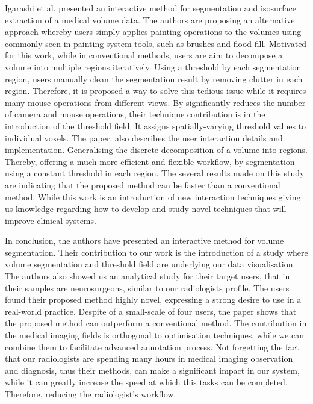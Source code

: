 Igarashi et al. \cite{igarashi2016interactive} presented an interactive method for segmentation and isosurface extraction of a medical volume data. The authors are proposing an alternative approach whereby users simply applies painting operations to the volumes using commonly seen in painting system tools, such as brushes and flood fill. Motivated for this work, while in conventional methods, users are aim to decompose a volume into multiple regions iteratively. Using a threshold by each segmentation region, users manually clean the segmentation result by removing clutter in each region. Therefore, it is proposed a way to solve this tedious issue while it requires many mouse operations from different views. By significantly reduces the number of camera and mouse operations, their technique contribution is in the introduction of the threshold field. It assigns spatially-varying threshold values to individual voxels. The paper, also describes the user interaction details and implementation. Generalising the discrete decomposition of a volume into regions. Thereby, offering a much more efficient and flexible workflow, by segmentation using a constant threshold in each region. The several results made on this study are indicating that the proposed method can be faster than a conventional method. While this work is an introduction of new interaction techniques giving us knowledge regarding how to develop and study novel techniques that will improve clinical systems.

In conclusion, the authors have presented an interactive method for volume segmentation. Their contribution to our work is the introduction of a study where volume segmentation and threshold field are underlying our data visualisation. The authors also showed us an analytical study for their target users, that in their samples are neurosurgeons, similar to our radiologists profile. The users found their proposed method highly novel, expressing a strong desire to use in a real-world practice. Despite of a small-scale of four users, the paper shows that the proposed method can outperform a conventional method. The contribution in the medical imaging fields is orthogonal to optimisation techniques, while we can combine them to facilitate advanced annotation process. Not forgetting the fact that our radiologists are spending many hours in medical imaging observation and diagnosis, thus their methods, can make a significant impact in our system, while it can greatly increase the speed at which this tasks can be completed. Therefore, reducing the radiologist's workflow.